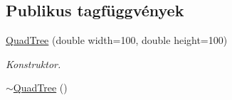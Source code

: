 \subsection*{Publikus tagfüggvények}
\begin{DoxyCompactItemize}
\item 
\hypertarget{class_quad_tree_ace31f8c41daaae0cb39e05bcd5a17c8d}{\hyperlink{class_quad_tree_ace31f8c41daaae0cb39e05bcd5a17c8d}{Quad\-Tree} (double width=100, double height=100)}\label{class_quad_tree_ace31f8c41daaae0cb39e05bcd5a17c8d}

\begin{DoxyCompactList}\small\item\em Konstruktor. \end{DoxyCompactList}\item 
\hypertarget{class_quad_tree_a6a4f976ec4e7c4c14315159073e96ddb}{\hyperlink{class_quad_tree_a6a4f976ec4e7c4c14315159073e96ddb}{$\sim$\-Quad\-Tree} ()}\label{class_quad_tree_a6a4f976ec4e7c4c14315159073e96ddb}


\end{DoxyCompactItemize}
